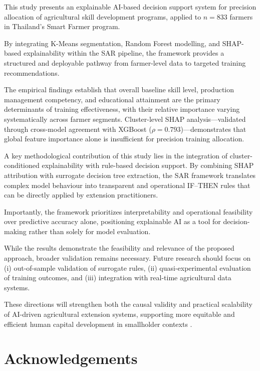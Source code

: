 \documentclass[3p,twocolumn,authoryear]{elsarticle}
\begin{document}
This study presents an explainable AI-based decision support system for
precision allocation of agricultural skill development programs, applied
to $n = 833$ farmers in Thailand's Smart Farmer program.

By integrating K-Means segmentation, Random Forest modelling, and
SHAP-based explainability within the SAR pipeline, the framework provides
a structured and deployable pathway from farmer-level data to targeted
training recommendations.

The empirical findings establish that overall baseline skill level,
production management competency, and educational attainment are the
primary determinants of training effectiveness, with their relative
importance varying systematically across farmer segments.
Cluster-level SHAP analysis—validated through cross-model agreement with
XGBoost ($\rho = 0.793$)—demonstrates that global feature importance
alone is insufficient for precision training allocation.

A key methodological contribution of this study lies in the integration
of cluster-conditioned explainability with rule-based decision support.
By combining SHAP attribution with surrogate decision tree extraction,
the SAR framework translates complex model behaviour into transparent
and operational IF--THEN rules that can be directly applied by extension
practitioners.

Importantly, the framework prioritizes interpretability and operational
feasibility over predictive accuracy alone, positioning explainable AI
as a tool for decision-making rather than solely for model evaluation.

While the results demonstrate the feasibility and relevance of the
proposed approach, broader validation remains necessary.
Future research should focus on (i) out-of-sample validation of surrogate
rules, (ii) quasi-experimental evaluation of training outcomes, and
(iii) integration with real-time agricultural data systems.

These directions will strengthen both the causal validity and practical
scalability of AI-driven agricultural extension systems, supporting more
equitable and efficient human capital development in smallholder
contexts \citep{yang2025,zhang2026}.

\section*{Acknowledgements}
\end{document}
